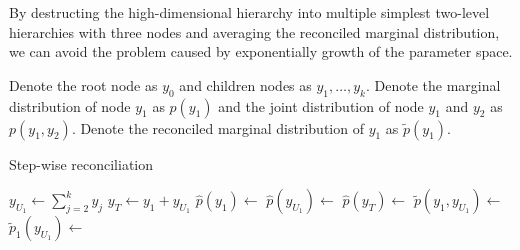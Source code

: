 \documentclass{article}
\begin{document}
   By destructing the high-dimensional hierarchy into multiple simplest two-level hierarchies with three nodes and averaging the reconciled marginal distribution, we can avoid the problem caused by exponentially growth of the parameter space. 
  

   Denote the root node as $y_0$ and children nodes as $y_1, \dots, y_k$. 
   Denote the marginal distribution of node $y_1$ as $p(y_1)$ and the joint distribution of node $y_1$ and $y_2$ as $p(y_1, y_2)$. 
   Denote the reconciled marginal distribution of $y_1$ as $\tilde p(y_1)$.

   \begin{algorithm}[H]
    \caption{Step-wise reconciliation}
    $y_{U_1} \leftarrow \sum\limits_{j=2}^k y_j$\;
    $y_T \leftarrow y_1 + y_{U_1}$ \;
    $\hat p(y_1) \leftarrow$ \;
    $\hat p(y_{U_1}) \leftarrow$ \;
    $\hat p(y_{T}) \leftarrow$ \;
    $\tilde p(y_1, y_{U_1}) \leftarrow $ \;
    $\tilde p_1(y_{U_1}) \leftarrow$ \;
    
   \end{algorithm}
\end{document}
